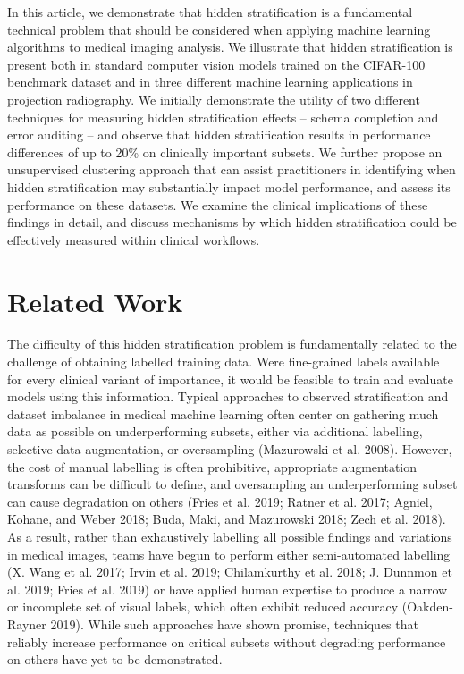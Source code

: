 \documentclass{article}
\begin{document}
In this article, we demonstrate that hidden stratification is a fundamental technical problem that should be considered when applying machine learning algorithms to medical imaging analysis.  
We illustrate that hidden stratification is present both in standard computer vision models trained on the CIFAR-100 benchmark dataset and in three different machine learning applications in projection radiography.  
We initially demonstrate the utility of two different techniques for measuring hidden stratification effects -- schema completion and error auditing -- and observe that  hidden stratification results in performance differences of up to 20\% on clinically important subsets.  
We further propose an unsupervised clustering approach that can assist practitioners in identifying when hidden stratification may substantially impact model performance, and assess its performance on these datasets.
We examine the clinical implications of these findings in detail, and discuss mechanisms by which hidden stratification could be effectively measured within clinical workflows.

\section{Related Work}

The difficulty of this hidden stratification problem is fundamentally related to the challenge of obtaining labelled training data.  
Were fine-grained labels available for every clinical variant of importance, it would be feasible to train and evaluate models using this information.  
Typical approaches to observed stratification and dataset imbalance in medical machine learning often center on gathering much data as possible on underperforming subsets, either via additional labelling, selective data augmentation, or oversampling (Mazurowski et al. 2008).  
However, the cost of manual labelling is often prohibitive, appropriate augmentation transforms can be difficult to define, and oversampling an underperforming subset can cause degradation on others (Fries et al. 2019; Ratner et al. 2017; Agniel, Kohane, and Weber 2018; Buda, Maki, and Mazurowski 2018; Zech et al. 2018).  
As a result, rather than exhaustively labelling all possible findings and variations in medical images, teams have begun to perform either semi-automated labelling (X. Wang et al. 2017; Irvin et al. 2019; Chilamkurthy et al. 2018; J. Dunnmon et al. 2019; Fries et al. 2019) or have applied human expertise to produce a narrow or incomplete set of visual labels, which often exhibit reduced accuracy (Oakden-Rayner 2019).  
While such approaches have shown promise, techniques that reliably increase performance on critical subsets without degrading performance on others have yet to be demonstrated.
 
\end{document}
